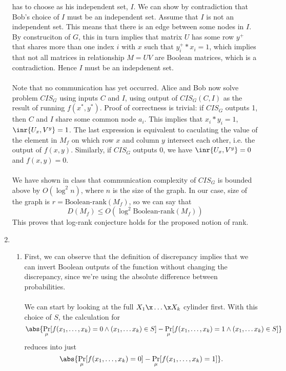 \documentclass{article}
\begin{document}
\begin{enumerate}
        has to choose as his independent set, $I$. We can show by contradiction
        that Bob's choice of $I$ must be an independent set. Assume that $I$ is
        not an independent set. This means that there is an edge between some
        nodes in $I$. By construciton of $G$, this in turn implies that matrix
        $U$ has some row $y^+$ that shares more than one index $i$ with $x$
        such that $y^+_i * x_i = 1$, which implies that not all matrices in
        relationship $M = UV$ are Boolean matrices, which is a contradiction.
        Hence $I$ must be an indepdenent set.
        \\\\
        Note that no communication has yet occurred. Alice and Bob now solve
        problem $CIS_G$ using inputs $C$ and $I$, using output of $CIS_G(C, I)$
        as the result of running $f(x^*,y^*)$. Proof of correctness is trivial:
        if $CIS_G$ outputs 1, then $C$ and $I$ share some common node $a_i$.
        This implies that $x_i * y_i = 1$, $\inr{U_x, V^y} = 1$. The last
        expression is equivalent to caculating the value of the element in
        $M_f$ on which row $x$ and column $y$ intersect each other, i.e. the
        output of $f(x, y)$. Similarly, if $CIS_G$ outputs $0$, we have
        $\inr{U_x, V^y} = 0$ and $f(x,y) = 0$.
        \\\\
        We have shown in class that communication complexity of $CIS_G$ is
        bounded above by $O(\log^2 n)$, where $n$ is the size of the graph. In
        our case, size of the graph is $r = \textrm{Boolean-rank}(M_f)$, so we
        can say that $$ D(M_f) \leq O(\log^2 \textrm{Boolean-rank}(M_f)) $$
        This proves that log-rank conjecture holds for the proposed notion of
        rank.
        \\

    \item 
    \begin{enumerate}
        \item First, we can observe that the definition of discrepancy implies
            that we can invert Boolean outputs of the function without changing
            the discrepancy, since we're using the absolute difference between
            probabilities.
            \\\\
            We can start by looking at the full $X_1 \x \ldots \x X_k$ cylinder
            first. With this choice of $S$, the calculation for
            $$\abs{\Pr_\mu[f(x_1, \ldots, x_k) = 0 \land (x_1, \ldots x_k) \in
            S] - \Pr_\mu[f(x_1, \ldots, x_k) = 1 \land (x_1, \ldots x_k) \in S]
            }$$
            reduces into just
            $$\abs{ \Pr_\mu[f(x_1, \ldots, x_k) = 0] - \Pr_\mu[f(x_1, \ldots,
            x_k) = 1] }.$$


\end{enumerate}
\end{enumerate}
\end{document}
